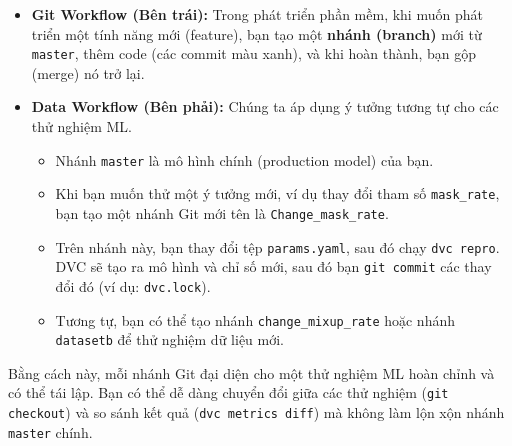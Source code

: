 \documentclass[11pt]{article}
\begin{document}
\begin{itemize}
    \item \textbf{Git Workflow (Bên trái):} Trong phát triển phần mềm, khi muốn phát triển một tính năng mới (feature), bạn tạo một \textbf{nhánh (branch)} mới từ \texttt{master}, thêm code (các commit màu xanh), và khi hoàn thành, bạn gộp (merge) nó trở lại.
    
    \item \textbf{Data Workflow (Bên phải):} Chúng ta áp dụng ý tưởng tương tự cho các thử nghiệm ML.
    \begin{itemize}
        \item Nhánh \texttt{master} là mô hình chính (production model) của bạn.
        \item Khi bạn muốn thử một ý tưởng mới, ví dụ thay đổi tham số \texttt{mask\_rate}, bạn tạo một nhánh Git mới tên là \texttt{Change\_mask\_rate}.
        \item Trên nhánh này, bạn thay đổi tệp \texttt{params.yaml}, sau đó chạy \texttt{dvc repro}. DVC sẽ tạo ra mô hình và chỉ số mới, sau đó bạn \texttt{git commit} các thay đổi đó (ví dụ: \texttt{dvc.lock}).
        \item Tương tự, bạn có thể tạo nhánh \texttt{change\_mixup\_rate} hoặc nhánh \texttt{datasetb} để thử nghiệm dữ liệu mới.
    \end{itemize}
\end{itemize}
Bằng cách này, mỗi nhánh Git đại diện cho một thử nghiệm ML hoàn chỉnh và có thể tái lập. Bạn có thể dễ dàng chuyển đổi giữa các thử nghiệm (\texttt{git checkout}) và so sánh kết quả (\texttt{dvc metrics diff}) mà không làm lộn xộn nhánh \texttt{master} chính.


\printbibliography
\end{document}
